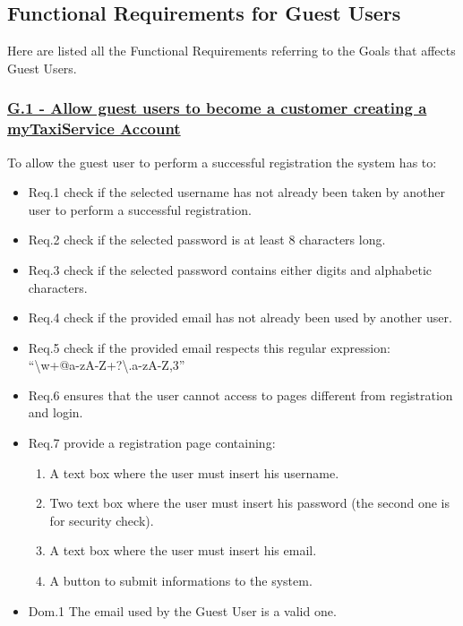 \documentclass{report}
\begin{document}
		\subsection{Functional Requirements for Guest Users}
		Here are listed all the Functional Requirements referring to the Goals that affects Guest Users.

			\subsubsection{\lbrack \hyperref[sec:g1]{G.1 - Allow guest users to become a customer creating a myTaxiService Account}\rbrack}
			To allow the guest user to perform a successful registration the system has to:

				\begin{itemize}
					\item \lbrack Req.1\rbrack \label{sec:fr1_g1} check if the selected username has not already been taken by another user to perform a successful registration.
					\item \lbrack Req.2\rbrack \label{sec:fr2_g1} check if the selected password is at least 8 characters long.
					\item \lbrack Req.3\rbrack \label{sec:fr3_g1} check if the selected password contains either digits and alphabetic characters.
					\item \lbrack Req.4\rbrack \label{sec:fr4_g1} check if the provided email has not already been used by another user.
					\item \lbrack Req.5\rbrack \label{sec:fr5_g1} check if the provided email respects this regular expression:\\ \textquotedblleft\textbackslash w+@\lbrack a-zA-Z\textunderscore\rbrack +?\textbackslash .\lbrack a-zA-Z\rbrack{},3\textbraceright\textdollar\textquotedblright
					\item \lbrack Req.6\rbrack \label{sec:fr6_g1} ensures that the user cannot access to pages different from registration and login.
					\item \lbrack Req.7\rbrack \label{sec:fr7_g1} provide a registration page containing:
						\begin{enumerate}
							\item A text box where the user must insert his username.
							\item Two text box where the user must insert his password (the second one is for security check).
							\item A text box where the user must insert his email. 
							\item A button to submit informations to the system.
						\end{enumerate}
					\item \lbrack Dom.1\rbrack \label{sec:da1_g1} The email used by the Guest User is a valid one.
				\end{itemize}
\end{document}
